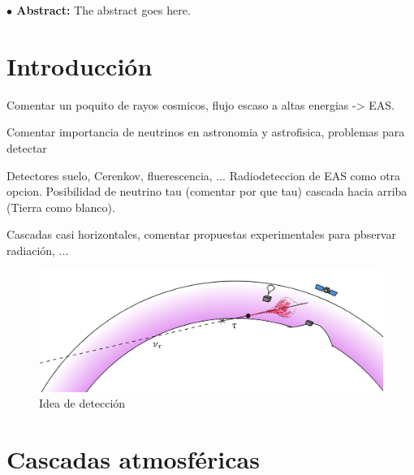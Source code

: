 \documentclass[12 pt, a4paper]{article} %
\numberwithin{equation}{section}
\numberwithin{figure}{section}
\numberwithin{table}{section}
\begin{document}
	
	\begin{flushleft}  {\bf $\bullet$ Abstract:\;\;}
		The abstract goes here.
	\end{flushleft}\mbox{}
	
	\clearpage
	\pagestyle{fancy}
	\lhead{}
	\chead{}
	\rhead{}
	\renewcommand{\headrulewidth}{0.1pt}
	\lfoot{} 
	\cfoot{\thepage}
	\rfoot{} 
	\renewcommand{\footrulewidth}{0pt}
	
	\setcounter{page}{1}
	\tableofcontents
	\clearpage
	
	\section{Introducción}\label{sec1}
	Comentar un poquito de rayos cosmicos, flujo escaso a altas energias -> EAS. 
	
	Comentar importancia de neutrinos en astronomia y astrofisica, problemas para detectar
	
	Detectores suelo, Cerenkov, fluerescencia, ... Radiodeteccion de EAS como otra opcion. Posibilidad de neutrino tau (comentar por que tau) cascada hacia arriba (Tierra como blanco). 
	
	Cascadas casi horizontales, comentar propuestas experimentales para pbservar radiación, ...
	
	\begin{figure}[H]
		\centering
		\includegraphics[width=.85\linewidth]{figures/shower_up}
		\caption{Idea de detección}
		\label{shower_up}
	\end{figure}
	\clearpage
	\section{Cascadas atmosféricas}\label{sec2}
%	
%	
\end{document}
